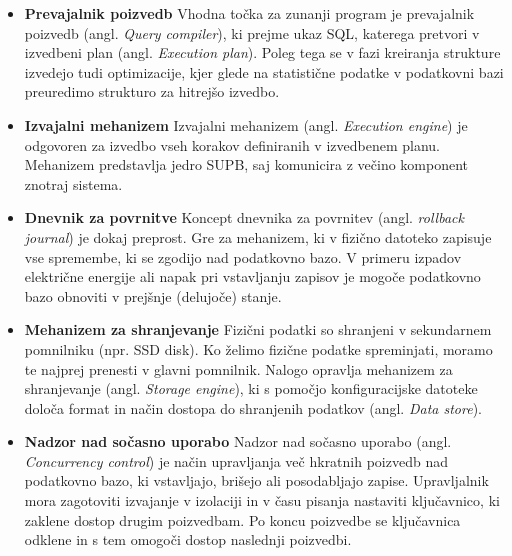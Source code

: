 \documentclass[a4paper,12pt,openright]{book}
\begin{document}
    \begin{itemize}
        \item \textbf{Prevajalnik poizvedb}\newline\noindent
        Vhodna točka za zunanji program je prevajalnik poizvedb (angl. \textit{Query compiler}), ki prejme ukaz SQL, katerega pretvori v izvedbeni plan (angl. \textit{Execution plan}). Poleg tega se v fazi kreiranja strukture izvedejo tudi optimizacije, kjer glede na statistične podatke v podatkovni bazi preuredimo strukturo za hitrejšo izvedbo.
        
        \item \textbf{Izvajalni mehanizem}\newline\noindent
        Izvajalni mehanizem (angl. \textit{Execution engine}) je odgovoren za izvedbo vseh korakov definiranih v izvedbenem planu. Mehanizem predstavlja jedro SUPB, saj komunicira z večino komponent znotraj sistema.
        
        \item \textbf{Dnevnik za povrnitve}\newline\noindent
        Koncept dnevnika za povrnitev (angl. \textit{rollback journal}) je dokaj preprost. Gre za mehanizem, ki v fizično datoteko zapisuje vse spremembe, ki se zgodijo nad podatkovno bazo. V primeru izpadov električne energije ali napak pri vstavljanju zapisov je mogoče podatkovno bazo obnoviti v prejšnje (delujoče) stanje.
        
        \item \textbf{Mehanizem za shranjevanje}\newline\noindent
        Fizični podatki so shranjeni v sekundarnem pomnilniku (npr. SSD disk). Ko želimo fizične podatke spreminjati, moramo te najprej prenesti v glavni pomnilnik. Nalogo opravlja mehanizem za shranjevanje (angl. \textit{Storage engine}), ki s pomočjo konfiguracijske datoteke določa format in način dostopa do shranjenih podatkov (angl. \textit{Data store}).
        
        \item \textbf{Nadzor nad sočasno uporabo}\newline\noindent
        Nadzor nad sočasno uporabo (angl. \textit{Concurrency control}) je način upravljanja več hkratnih poizvedb nad podatkovno bazo, ki vstavljajo, brišejo ali posodabljajo zapise. Upravljalnik mora zagotoviti izvajanje v izolaciji in v času pisanja nastaviti ključavnico, ki zaklene dostop drugim poizvedbam. Po koncu poizvedbe se ključavnica odklene in s tem omogoči dostop naslednji poizvedbi.
        
    \end{itemize}
\end{document}
